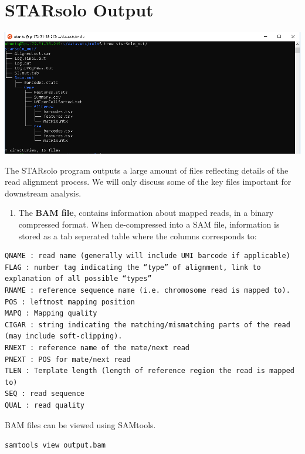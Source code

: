 \documentclass[]{book}
\providecommand{\tightlist}{%
  \setlength{\itemsep}{0pt}\setlength{\parskip}{0pt}}
\begin{document}
\hypertarget{starsolo-output}{%
\section{STARsolo Output}\label{starsolo-output}}

\includegraphics[width=9.79in]{_book/10X_files/figure-html/output}

The STARsolo program outputs a large amount of files reflecting details of the read alignment process. We will only discuss some of the key files important for downstream analysis.

\begin{enumerate}
\def\labelenumi{\arabic{enumi}.}
\tightlist
\item
  The \textbf{BAM file}, contains information about mapped reads, in a binary compressed format. When de-compressed into a SAM file, information is stored as a tab seperated table where the columns corresponds to:
\end{enumerate}

\begin{verbatim}
QNAME : read name (generally will include UMI barcode if applicable)
FLAG : number tag indicating the “type” of alignment, link to explanation of all possible “types”
RNAME : reference sequence name (i.e. chromosome read is mapped to).
POS : leftmost mapping position
MAPQ : Mapping quality
CIGAR : string indicating the matching/mismatching parts of the read (may include soft-clipping).
RNEXT : reference name of the mate/next read
PNEXT : POS for mate/next read
TLEN : Template length (length of reference region the read is mapped to)
SEQ : read sequence
QUAL : read quality
\end{verbatim}

BAM files can be viewed using SAMtools.

\texttt{samtools\ view\ output.bam}
\end{document}
